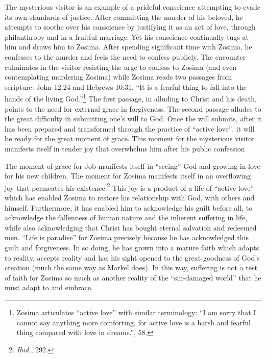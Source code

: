 The mysterious visitor is an example of a prideful conscience attempting to evade its own standards of justice. After committing the murder of his beloved, he attempts to soothe over his conscience by justifying it as an act of love, through philanthropy and in a fruitful marriage. Yet his conscience continually tugs at him and draws him to Zosima. After spending significant time with Zosima, he confesses to the murder and feels the need to confess publicly. The encounter culminates in the visitor resisting the urge to confess to Zosima (and even contemplating murdering Zosima) while Zosima reads two passages from scripture: John 12:24 and Hebrews 10:31, ``It is a fearful thing to fall into the hands of the living God.''\footnote{Zosima articulates ``active love'' with similar terminology: ``I am sorry that I cannot say anything more comforting, for active love is a harsh and fearful thing compared with love in dreams.'', 58.} The first passage, in alluding to Christ and his death, points to the need for external grace in forgiveness. The second passage alludes to the great difficulty in submitting one's will to God. Once the will submits, after it has been prepared and transformed through the practice of ``active love'', it will be ready for the great moment of grace. This moment for the mysterious visitor manifests itself in tender joy that overwhelms him after his public confession

The moment of grace for Job manifests itself in ``seeing'' God and growing in love for his new children. The moment for Zosima manifests itself in an overflowing joy that permeates his existence.\footnote{\emph{Ibid.}, 292.} This joy is a product of a life of ``active love'' which has enabled Zosima to restore his relationship with God, with others and himself. Furthermore, it has enabled him to acknowledge his guilt before all, to acknowledge the fallenness of human nature and the inherent suffering in life, while also acknowledging that Christ has bought eternal salvation and redeemed men. ``Life is paradise'' for Zosima precisely because he has acknowledged this guilt and forgiveness. In so doing, he has grown into a mature faith which adapts to reality, accepts reality and has his sight opened to the great goodness of God's creation (much the same way as Markel does). In this way, suffering is not a test of faith for Zosima so much as another reality of the ``sin-damaged world'' that he must adapt to and embrace. 

